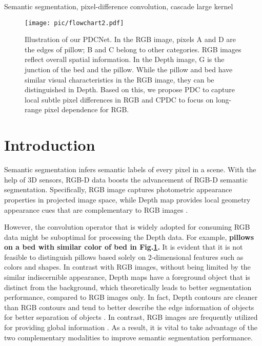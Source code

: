\documentclass[lettersize,journal]{IEEEtran}
\begin{document}
\begin{IEEEkeywords} 
Semantic segmentation, pixel-difference convolution,  cascade large kernel
\end{IEEEkeywords} 


\begin{figure}
    \centering
    \texttt{[image: pic/flowchart2.pdf]}
    \caption{Illustration of our PDCNet. In the RGB image, pixels A and D are the edges of pillow; B and C belong to other categories. RGB images reflect overall spatial information. In the Depth image, G is the junction of the bed and the pillow. While the pillow and bed have similar visual characteristics in the RGB image, they can be distinguished in Depth. Based on this, we propose PDC to capture local subtle pixel differences in RGB and CPDC to focus on long-range pixel dependence for RGB.}
    \label{hard_sample2}
\end{figure}


\section{Introduction}
Semantic segmentation infers semantic labels of every pixel in a scene. \iffalse Over the past few years, many semantic segmentation models have been proposed \cite{long2015fully,badrinarayanan2017segnet,chen2017deeplab,xie2021segformer,qi2019amodal,lin2016efficient}, and most of them are based on RGB images.\fi With the help of 3D sensors, RGB-D data boosts the advancement of RGB-D semantic segmentation. \iffalse After encoding the real-world geometric information, the RGB-D images can be applied to overcome the challenge of 2D only displaying the photometric appearance properties in the projected image space and enrich the representation of RGB images. \fi Specifically, RGB image captures photometric appearance properties in projected image space, while Depth map provides local geometry appearance cues that are complementary to RGB images \cite{huang2022adaptive, liu2022geometrymotion}.

However, the convolution operator that is widely adopted for consuming RGB data might be suboptimal for processing the Depth data. For example, \textbf{pillows on a bed with similar color of bed in Fig.\ref{hard_sample2}.} It is evident that it is not feasible to distinguish pillows based solely on 2-dimensional features such as colors and shapes. 
In contrast with RGB images, without being limited by the similar indiscernible appearance, Depth maps have a foreground object that is distinct from the background, which theoretically leads to better segmentation performance, compared to RGB images only. In fact, Depth contours are cleaner than RGB contours and tend to better describe the edge information of objects for better separation of objects \cite{zhao2022self}. In contrast, RGB images are frequently utilized for providing global information \cite{wang2018non}. As a result, it is vital to take advantage of the two complementary modalities to improve semantic segmentation performance.
\end{document}
